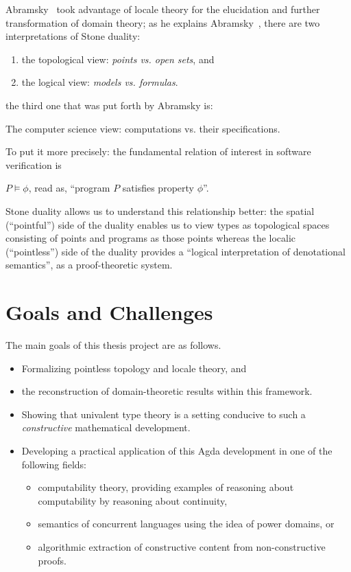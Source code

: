 \documentclass{article}
\begin{document}
Abramsky~\cite{abramsky:1991} took advantage of locale theory for the elucidation and
further transformation of domain theory; as he explains Abramsky~\cite{abramsky:1991},
there are two interpretations of Stone duality:
\begin{enumerate}
  \item the topological view: \emph{points vs. open sets}, and
  \item the logical view: \emph{models vs. formulas}.
\end{enumerate}
the third one that was put forth by Abramsky is:
\begin{center}
  The computer science view: computations vs. their specifications.
\end{center}

To put it more precisely: the fundamental relation of interest in software verification is

\begin{center}
  $P \vDash \phi$, \qquad read as, \qquad ``program $P$ satisfies property $\phi$''.
\end{center}

Stone duality allows us to understand this relationship better: the spatial (``pointful'')
side of the duality enables us to view types as topological spaces consisting of points
and programs as those points whereas the localic (``pointless'') side of the duality
provides a ``logical interpretation of denotational semantics'', as a proof-theoretic
system.

\section{Goals and Challenges}

The main goals of this thesis project are as follows.

\begin{itemize}
  \item Formalizing pointless topology and locale theory, and
  \item the reconstruction of domain-theoretic results within this framework.
  \item Showing that univalent type theory is a setting conducive to such a
    \emph{constructive} mathematical development.
  \item Developing a practical application of this Agda development in one of the following fields:
    \begin{itemize}
      \item computability theory, providing examples of reasoning about computability by reasoning
        about continuity,
      \item semantics of concurrent languages using the idea of power domains, or
      \item algorithmic extraction of constructive content from non-constructive proofs.
    \end{itemize}
\end{itemize}
\end{document}
